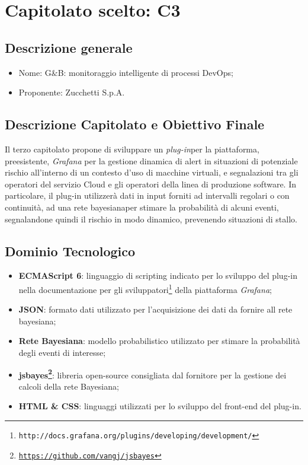 \section{Capitolato scelto: C3}

\subsection{Descrizione generale}
\begin{itemize}
	\item Nome: G$\&$B: monitoraggio intelligente di processi DevOps;
	\item Proponente: Zucchetti S.p.A.
\end{itemize}

\subsection{Descrizione Capitolato e Obiettivo Finale}
Il terzo capitolato propone di sviluppare un \textit{plug-in}\glossario per la piattaforma, preesistente, \textit{Grafana} per la gestione dinamica di alert in situazioni di potenziale rischio all'interno di un contesto d'uso di macchine virtuali, e segnalazioni tra gli operatori del servizio Cloud e gli operatori della linea di produzione software.
In particolare, il plug-in  utilizzerà dati in input forniti ad intervalli regolari o con continuità, ad una rete bayesiana\glossario per stimare la probabilità di alcuni eventi, segnalandone quindi il rischio in modo dinamico, prevenendo situazioni di stallo.

\subsection{Dominio Tecnologico}
\begin{itemize}
	\item \textbf{ECMAScript 6\glossario}: linguaggio di scripting indicato per lo sviluppo del plug-in nella documentazione per gli sviluppatori\footnote{\texttt{http://docs.grafana.org/plugins/developing/development/}} della piattaforma \textit{Grafana};
	\item \textbf{JSON}: formato dati utilizzato per l'acquisizione dei dati da fornire all rete bayesiana;
	\item \textbf{Rete Bayesiana}: modello probabilistico utilizzato per stimare la probabilità degli eventi di interesse;
	\item \textbf{jsbayes\footnote{\hyperref[Link al repository GitHub]{\texttt{https://github.com/vangj/jsbayes}}}}: libreria open-source consigliata dal fornitore per la gestione dei calcoli della rete Bayesiana;
	\item \textbf{HTML \& CSS}: linguaggi utilizzati per lo sviluppo del front-end del plug-in.
\end{itemize}

